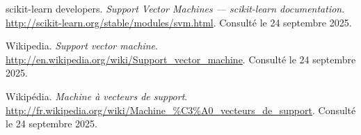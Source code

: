 \documentclass[
  12pt,
]{article}
\begin{document}
\begin{thebibliography}{9}

scikit-learn developers.  
\textit{Support Vector Machines — scikit-learn documentation}.  
\url{http://scikit-learn.org/stable/modules/svm.html}.  
Consulté le 24 septembre 2025.

Wikipedia.  
\textit{Support vector machine}.  
\url{http://en.wikipedia.org/wiki/Support_vector_machine}.  
Consulté le 24 septembre 2025.

Wikipédia.  
\textit{Machine à vecteurs de support}.  
\url{http://fr.wikipedia.org/wiki/Machine_%C3%A0_vecteurs_de_support}.  %
Consulté le 24 septembre 2025.

\end{thebibliography}
\end{document}
